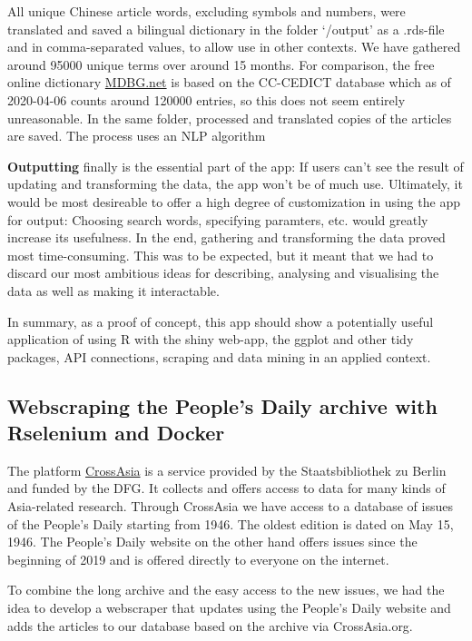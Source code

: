 \documentclass[12pt,a4paper]{article}
\begin{document}
All unique Chinese article words, excluding symbols and numbers, were translated and saved a bilingual dictionary in the folder `/output' as a .rds-file and in comma-separated values, to allow use in other contexts. We have gathered around 95000 unique terms over around 15 months. For comparison, the free online dictionary \href{https://www.mdbg.net/chinese/dictionary?page=cedict}{MDBG.net} is based on the CC-CEDICT database which as of 2020-04-06 counts around 120000 entries, so this does not seem entirely unreasonable. In the same folder, processed and translated copies of the articles are saved. The process uses an NLP algorithm

\textbf{Outputting} finally is the essential part of the app: If users can't see the result of updating and transforming the data, the app won't be of much use. Ultimately, it would be most desireable to offer a high degree of customization in using the app for output: Choosing search words, specifying paramters, etc. would greatly increase its usefulness. In the end, gathering and transforming the data proved most time-consuming. This was to be expected, but it meant that we had to discard our most ambitious ideas for describing, analysing and visualising the data as well as making it interactable.

In summary, as a proof of concept, this app should show a potentially useful application of using R with the shiny web-app, the ggplot and other tidy packages, API connections, scraping and data mining in an applied context.

\hypertarget{webscraping-the-peoples-daily-archive-with-rselenium-and-docker}{%
\subsection{Webscraping the People's Daily archive with Rselenium and Docker}\label{webscraping-the-peoples-daily-archive-with-rselenium-and-docker}}

The platform \href{CrossAsia.org}{CrossAsia} is a service provided by the Staatsbibliothek zu Berlin and funded by the DFG. It collects and offers access to data for many kinds of Asia-related research. Through CrossAsia we have access to a database of issues of the People's Daily starting from 1946. The oldest edition is dated on May 15, 1946. The People's Daily website on the other hand offers issues since the beginning of 2019 and is offered directly to everyone on the internet.

To combine the long archive and the easy access to the new issues, we had the idea to develop a webscraper that updates using the People's Daily website and adds the articles to our database based on the archive via CrossAsia.org.
\end{document}
